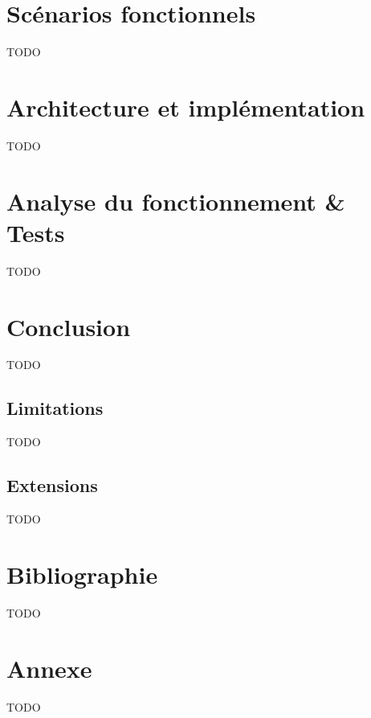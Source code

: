 \documentclass[12pt, openany]{report}
\begin{document}
\section{Scénarios fonctionnels}
\noindent 
\begin{flushleft}
TODO
\end{flushleft}

\section{Architecture et implémentation}
\noindent 
\begin{flushleft}
TODO
\end{flushleft}

\section{Analyse du fonctionnement \& Tests}
\noindent 
\begin{flushleft}
TODO
\end{flushleft}

\section{Conclusion}
\noindent 
\begin{flushleft}
TODO
\end{flushleft}
\subsection{Limitations}
\noindent 
\begin{flushleft}
TODO
\end{flushleft}
\subsection{Extensions}
\noindent 
\begin{flushleft}
TODO
\end{flushleft}

\section{Bibliographie}
\noindent 
\begin{flushleft}
TODO
\end{flushleft}

\section{Annexe}
\noindent 
\begin{flushleft}
TODO
\end{flushleft}
\end{document}
